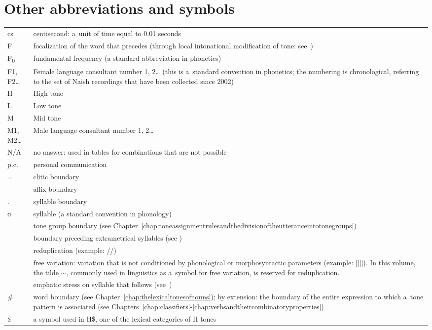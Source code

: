 \section*{Other abbreviations and symbols}
\label{sec:othersymbols}

\begin{table}[H]
{\renewcommand{\arraystretch}{1.35}
\begin{tabularx}{\textwidth}{ @{}l Q } 
 cs & centisecond: a~unit of time equal to 0.01 seconds\\
 F & \parbox[t]{\linewidth}{focalization of the word that precedes (through local intonational modification of tone: see~)}\\
 F\textsubscript{0} & fundamental frequency (a standard abbreviation in phonetics)\\
 F1, F2{\dots} & \parbox[t]{\linewidth}{Female language consultant number 1, 2{\dots} (this is a~standard convention in phonetics; the numbering is chronological, referring to the set of Naish recordings that have been collected since 2002)}\\
 H & High tone\\
 L & Low tone\\
 M & Mid tone\\
 M1, M2{\dots} & Male language consultant number 1, 2{\dots}\\
 N/A & no answer: used in tables for combinations that are not possible \\
 p.c. & personal communication\\
= & clitic boundary\\
- & affix boundary\\
. & syllable boundary\\
σ & syllable (a standard convention in phonology)\\
\ipa{|} & tone group boundary (see Chapter~\ref{chap:toneassignmentrulesandthedivisionoftheutteranceintotonegroups})\\
 & boundary preceding extrametrical syllables (see )\\
\ipa{{$\sim$}} & reduplication (example: //)\\
 & \parbox[t]{\linewidth}{free variation: variation that is not conditioned by phonological or morphosyntactic parameters (example: []{\kern2pt}[]). In this volume, the tilde {$\sim$}, commonly used in linguistics as a~symbol for free variation, is reserved for reduplication.}\\
 & emphatic stress on syllable that follows (see~)\\ 
\# & \parbox[t]{\linewidth}{word boundary (see Chapter~\ref{chap:thelexicaltonesofnouns}); by extension: the boundary of the entire expression to which a~tone pattern is associated (see Chapters~\ref{chap:classifiers}-\ref{chap:verbsandtheircombinatoryproperties})}\\
\$ & a symbol used in H\$, one of the lexical categories of H tones\\
\end{tabularx}}
\end{table}


